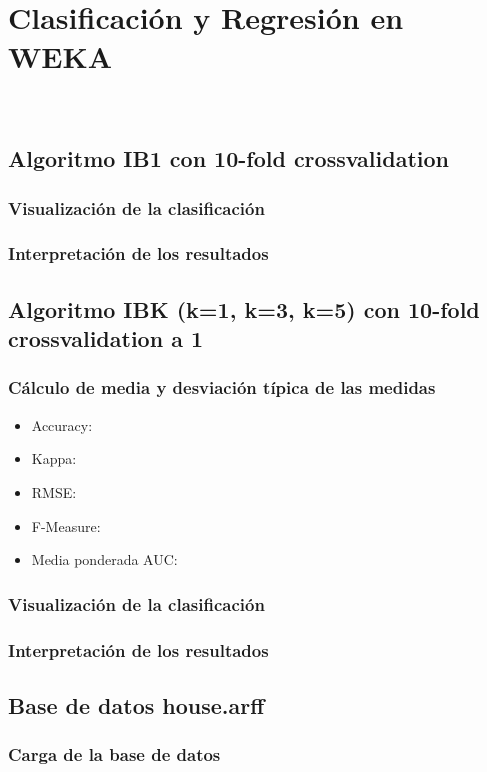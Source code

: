 \chapter{Clasificación y Regresión en WEKA}
\
\section{Algoritmo IB1 con 10-fold crossvalidation}
	\subsection{Visualización de la clasificación}
	\subsection{Interpretación de los resultados}

\newpage
\section{Algoritmo IBK (k=1, k=3, k=5) con 10-fold crossvalidation a 1}
	\subsection{Cálculo de media y desviación típica de las medidas}

	\begin{itemize}
		\item Accuracy:
		\item Kappa:
		\item RMSE:
		\item F-Measure:
		\item Media ponderada AUC:
	\end{itemize}

	\subsection{Visualización de la clasificación}
	\subsection{Interpretación de los resultados}
 
\newpage
\section{Base de datos house.arff}
	\subsection{Carga de la base de datos}
	
